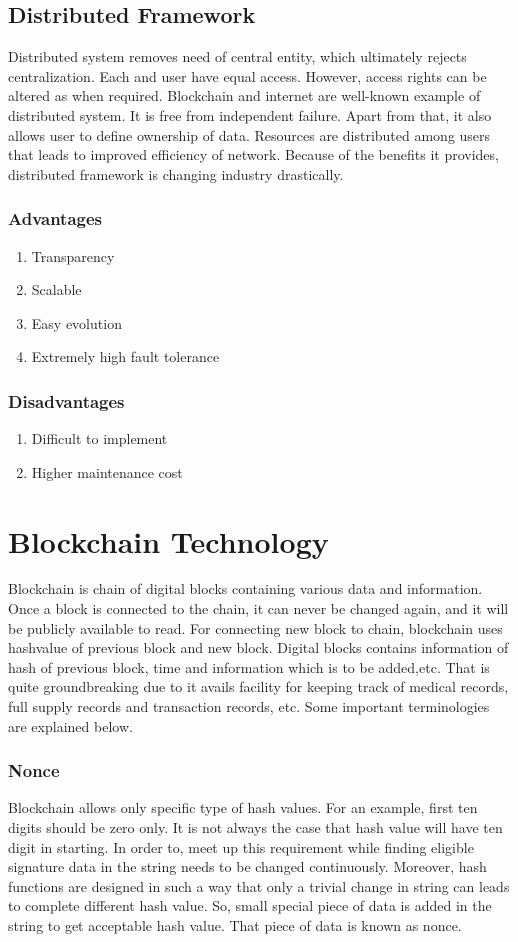 \documentclass[a4paper,twoside,12pt]{report}
\begin{document}
\begin{spacing}{1.5}
\subsection{Distributed Framework}
Distributed system removes need of central entity, which ultimately rejects centralization. Each and user have equal access. However, access rights can be altered as when required. Blockchain and internet are well-known example of distributed system. It is free from independent failure. Apart from that, it also allows user to define ownership of data. Resources are distributed among users that leads to improved efficiency of network. Because of the benefits it provides, distributed framework is changing industry drastically.
\subsubsection{Advantages}
\begin{enumerate}
	\item{Transparency}
	\item{Scalable}
	\item{Easy evolution}
	\item{Extremely high fault tolerance}
\end{enumerate}
\subsubsection{Disadvantages}
\begin{enumerate}
	\item{Difficult to implement}
	\item{Higher maintenance cost}
\end{enumerate} 
\section{Blockchain Technology}
Blockchain is chain of digital blocks containing various data and information. Once a block is connected to the chain, it can never be changed again, and it will be publicly available to read. For connecting new block to chain, blockchain uses hashvalue of previous block and new block. Digital blocks contains information of hash of previous block, time and information which is to be added,etc. That is quite groundbreaking due to it avails facility for keeping track of medical records, full supply records and transaction records, etc. Some important terminologies are explained below.
\subsubsection{Nonce}
Blockchain allows only specific type of hash values. For an example, first ten digits should be zero only. It is not always the case that hash value will have ten digit in starting. In order to, meet up this requirement while finding eligible signature data in the string needs to be changed continuously. Moreover, hash functions are designed in such a way that only a trivial change in string can leads to complete different hash value. So, small special piece of data is added in the string to get acceptable hash value. That piece of data is known as nonce.   

\end{spacing}
\end{document}
